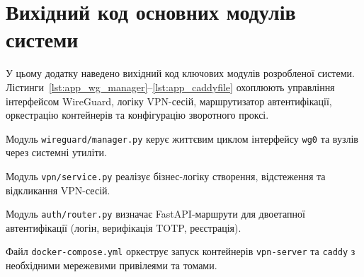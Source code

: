 \chapter{Вихідний код основних модулів системи}
\label{appendix:source_code}

У цьому додатку наведено вихідний код ключових модулів розробленої системи.
Лістинги~\ref{lst:app_wg_manager}--\ref{lst:app_caddyfile} охоплюють управління
інтерфейсом WireGuard, логіку VPN-сесій, маршрутизатор автентифікації,
оркестрацію контейнерів та конфігурацію зворотного проксі.


Модуль \texttt{wireguard/manager.py} керує життєвим циклом інтерфейсу
\texttt{wg0} та вузлів через системні утиліти.




Модуль \texttt{vpn/service.py} реалізує бізнес-логіку створення, відстеження
та відкликання VPN-сесій.




Модуль \texttt{auth/router.py} визначає FastAPI-маршрути для двоетапної
автентифікації (логін, верифікація TOTP, реєстрація).




Файл \texttt{docker-compose.yml} оркеструє запуск контейнерів
\texttt{vpn-server} та \texttt{caddy} з необхідними мережевими привілеями
та томами.



